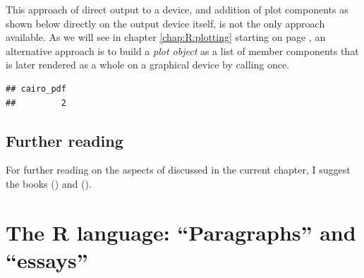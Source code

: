 \documentclass[krantz2]{krantz}\usepackage{knitr}
\begin{document}
\begin{warningbox}
This approach of direct output to a device, and addition of plot components as shown below directly on the output device itself, is not the only approach available. As we will see in chapter \ref{chap:R:plotting} starting on page \pageref{chap:R:plotting}, an alternative approach is to build a \emph{plot object} as a list of member components that is later rendered as a whole on a graphical device by calling  once.

\begin{knitrout}\footnotesize
{}\color{fgcolor}\begin{kframe}
\begin{alltt}
\hlstd{(} \hlstd{=} \hlstd{,}  \hlstd{=} \hlstd{,}  \hlstd{=} \hlstd{)}
 \hlopt{~}   
\hlstd{(} \hlstd{=} \hlstd{,}  \hlstd{=} \hlstd{,}  \hlstd{=} \hlstd{)}
\hlstd{()}
\end{alltt}
\begin{verbatim}
## cairo_pdf
##         2
\end{verbatim}
\end{kframe}
\end{knitrout}
\end{warningbox}

\section{Further reading}
For further reading on the aspects of \Rlang discussed in the current chapter,
 I suggest the books  (\citeauthor{Peng2016}) and  (\citeauthor{Matloff2011}).











\chapter{The R language: ``Paragraphs'' and ``essays''}\label{chap:R:scripts}
\end{document}
